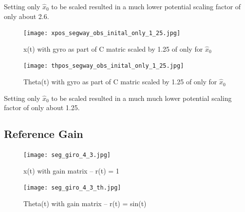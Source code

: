 \documentclass{article}
\begin{document}
Setting only $\hat{x}_0$ to be scaled resulted in a much lower potential scaling factor of only about 2.6.
\begin{figure}[H]
    \centering
    \texttt{[image: xpos\_segway\_obs\_inital\_only\_1\_25.jpg]}
    \caption{x(t) with gyro as part of C matric scaled by 1.25 of only for $\hat{x}_0$}
    \label{fig:x_segway}
\end{figure}

\begin{figure}[H]
    \centering
    \texttt{[image: thpos\_segway\_obs\_inital\_only\_1\_25.jpg]}
    \caption{Theta(t) with gyro as part of C matric scaled by 1.25 of only for $\hat{x}_0$}
    \label{fig:th_segway}
\end{figure}

Setting only $\hat{x}_0$ to be scaled resulted in a much much lower potential scaling factor of only about 1.25.

\subsection{Reference Gain}
\begin{figure}[H]
    \centering
    \texttt{[image: seg\_giro\_4\_3.jpg]}
    \caption{x(t) with gain matrix -- r(t) = 1}
    \label{fig:x_segway}
\end{figure}

\begin{figure}[H]
    \centering
    \texttt{[image: seg\_giro\_4\_3\_th.jpg]}
    \caption{Theta(t) with gain matrix -- r(t) = sin(t)}
    \label{fig:th_segway}
\end{figure}
\end{document}
